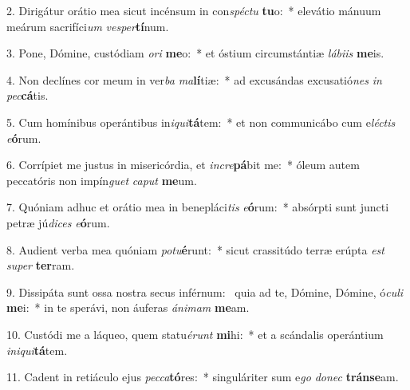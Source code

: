2. Dirigátur orátio mea sicut incénsum in con\textit{spéc}\textit{tu} \textbf{tu}o:~*  elevátio mánuum meárum sacrifíci\textit{um} \textit{ves}\textit{per}\textbf{tí}num.\

3. Pone, Dómine, custódiam \textit{o}\textit{ri} \textbf{me}o:~*  et óstium circumstántiæ \textit{lá}\textit{bi}\textit{is} \textbf{me}is.\

4. Non declínes cor meum in ver\textit{ba} \textit{ma}\textbf{lí}tiæ:~*  ad excusándas excusatió\textit{nes} \textit{in} \textit{pec}\textbf{cá}tis.\

5. Cum homínibus operántibus in\textit{i}\textit{qui}\textbf{tá}tem:~*  et non communicábo cum e\textit{léc}\textit{tis} \textit{e}\textbf{ó}rum.\

6. Corrípiet me justus in misericórdia, et \textit{in}\textit{cre}\textbf{pá}bit me:~*  óleum autem peccatóris non impín\textit{guet} \textit{ca}\textit{put} \textbf{me}um.\

7. Quóniam adhuc et orátio mea in benepláci\textit{tis} \textit{e}\textbf{ó}rum:~*  absórpti sunt juncti petræ jú\textit{di}\textit{ces} \textit{e}\textbf{ó}rum.\

8. Audient verba mea quóniam \textit{pot}\textit{u}\textbf{é}runt:~*  sicut crassitúdo terræ erúpta \textit{est} \textit{su}\textit{per} \textbf{ter}ram.\

9. Dissipáta sunt ossa nostra secus inférnum: \dag\  quia ad te, Dómine, Dómine, ó\textit{cu}\textit{li} \textbf{me}i:~*  in te sperávi, non áuferas \textit{á}\textit{ni}\textit{mam} \textbf{me}am.\

10. Custódi me a láqueo, quem statu\textit{é}\textit{runt} \textbf{mi}hi:~*  et a scándalis operántium \textit{in}\textit{i}\textit{qui}\textbf{tá}tem.\

11. Cadent in retiáculo ejus \textit{pec}\textit{ca}\textbf{tó}res:~*  singuláriter sum e\textit{go} \textit{do}\textit{nec} \textbf{tráns}\textbf{e}am.\


